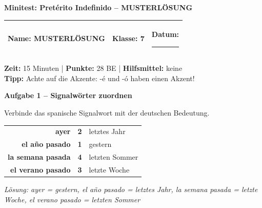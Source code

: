 \documentclass[11pt, a4paper]{article}
\newcommand{\fachfarbe}{spanisch}
\newcommand{\thema}{Minitest: Pretérito Indefinido -- MUSTERLÖSUNG}
\newcommand{\klasse}{7}
\newcommand{\maxpunkte}{28}
\newcommand{\zeit}{15 Minuten}
\newcommand{\punktebox}[1]{\hfill\fbox{\small \_/#1}}
\newcommand{\luecke}[1]{\rule{#1}{0.4pt}}
\newcommand{\lsg}[1]{\textcolor{loesung}{\textbf{#1}}}
\newenvironment{aufgabe}[1]{%
    \needspace{5\baselineskip}%
    \nopagebreak[4]%
    \vspace{10pt}
    \noindent\textbf{\textcolor{\fachfarbe}{Aufgabe #1}}
    \nopagebreak[4]%
    \vspace{5pt}
    \nopagebreak[4]%
    \begin{list}{}{\leftmargin=0pt}
    \item[]
}{%
    \end{list}
}
\newcommand{\es}[1]{\textcolor{\fachfarbe}{\textbf{#1}}}
\begin{document}

\begin{center}
    {\Large\bfseries\textcolor{\fachfarbe}{\thema}}
\end{center}

\vspace{5pt}

\noindent
\begin{tabularx}{\textwidth}{|X|X|X|}
\hline
\textbf{Name:} \lsg{MUSTERLÖSUNG} &
\textbf{Klasse:} \klasse &
\textbf{Datum:} \luecke{2cm} \\
\hline
\end{tabularx}

\vspace{10pt}

\begin{infobox}
\textbf{Zeit:} \zeit{} | \textbf{Punkte:} \maxpunkte{} BE | \textbf{Hilfsmittel:} keine \\
\textbf{Tipp:} Achte auf die Akzente: -é und -ó haben einen Akzent!
\end{infobox}

\vspace{15pt}


\begin{aufgabe}{1 -- Signalwörter zuordnen}
Verbinde das spanische Signalwort mit der deutschen Bedeutung. \punktebox{4}
\end{aufgabe}

\begin{center}
\begin{tabular}{rcl}
\es{ayer} & \lsg{2} & letztes Jahr \\[0.8em]
\es{el año pasado} & \lsg{1} & gestern \\[0.8em]
\es{la semana pasada} & \lsg{4} & letzten Sommer \\[0.8em]
\es{el verano pasado} & \lsg{3} & letzte Woche \\
\end{tabular}
\end{center}

\textit{Lösung: ayer = gestern, el año pasado = letztes Jahr, la semana pasada = letzte Woche, el verano pasado = letzten Sommer}
\end{document}
